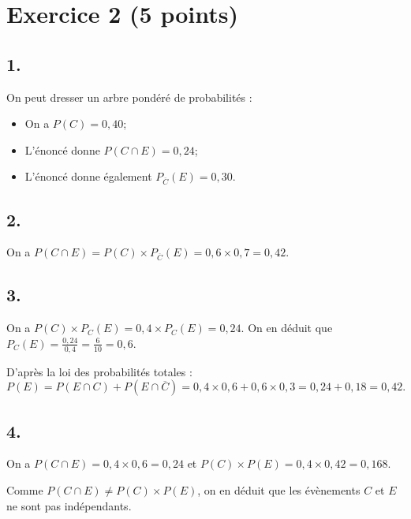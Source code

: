 \section*{Exercice 2 (5 points)}
	

	\subsection*{1.}
	On peut dresser un arbre pondéré de probabilités :
	


	
	
	\begin{itemize}
		\item On a  $P(C) = 0,40$; 
		\item L’énoncé donne  $P(C \cap E) = 0,24$; 
		\item  L’énoncé donne également $ P_{\overline{C}}(E)= 0,30$.
	\end{itemize}
	
	
	\subsection*{2.}
	On a $P(C \cap E) = P(C) \times P_{\overline{C}}(E) = 0,6 \times 0,7 = 0,42$.
	
	\subsection*{3.}
	On a $P(C) \times P_C(E)= 0,4 \times P_C(E)= 0,24$. On en déduit que $P_C(E) = \frac{0,24}{0,4} = \frac{6}{10} = 0,6$.
	
	D’après la loi des probabilités totales :
	\[
	P(E) = P(E \cap C) + P(E \cap \overline{C}) = 0,4 \times 0,6 + 0,6 \times 0,3 = 0,24 + 0,18 = 0,42.
	\]
	
	\subsection*{4.}
	On a $P(C \cap E) = 0,4 \times 0,6 = 0,24$ et $P(C) \times P(E) = 0,4 \times 0,42 = 0,168$.
	
	Comme $P(C \cap E) \neq P(C) \times P(E)$, on en déduit que les évènements $C$ et $E$ ne sont pas indépendants.
